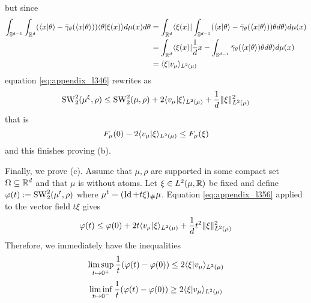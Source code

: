 but since
\begin{align}
    \int_{\mathbb S^{d-1}} \int_{\mathbb R^d} (\langle x|\theta\rangle - \bar{\gamma}_\theta(\langle x|\theta\rangle)) \langle\theta|\xi(x)\rangle d\mu(x) d\theta &= \int_{\mathbb R^d} \langle\xi(x)|\int_{\mathbb S^{d-1}} (\langle x|\theta\rangle - \bar{\gamma}_\theta(\langle x|\theta\rangle))\theta d\theta\rangle d\mu(x) \\
    &= \int_{\mathbb R^d} \langle\xi(x)|\frac{1}{d} x - \int_{\mathbb S^{d-1}} \bar{\gamma}_\theta(\langle x|\theta\rangle)\theta d\theta\rangle d\mu(x) \\
    &= \langle\xi|v_\mu\rangle_{L^2(\mu)}
\end{align}
equation \eqref{eq:appendix_l346} rewrites as
\begin{equation} \label{eq:appendix_l356}
    \mathop{\mathrm{SW}}\nolimits^2_2(\mu^\xi,\rho) \leq \mathop{\mathrm{SW}}\nolimits^2_2(\mu,\rho) + 2\langle v_\mu|\xi\rangle_{L^2(\mu)} + \frac 1d \|\xi\|^2_{L^2(\mu)}
\end{equation}
that is
\begin{equation} F_\mu(0) - 2\langle v_\mu|\xi\rangle_{L^2(\mu)} \leq F_\mu(\xi) \end{equation}
and this finishes proving (b). \newline

Finally, we prove (c). Assume that $\mu, \rho$ are supported in some compact set $\Omega \subseteq \mathbb R^d$ and that $\mu$ is without atoms. Let $\xi \in L^2(\mu,\mathbb R)$ be fixed and define $\varphi(t) := \mathop{\mathrm{SW}}\nolimits^2_2(\mu^t,\rho)$ where $\mu^t = (\mathop{\mathrm{Id}}\nolimits+t\xi)_\#\mu$. Equation \eqref{eq:appendix_l356} applied to the vector field $t\xi$ gives
\begin{equation} \varphi(t) \leq \varphi(0) + 2t\langle v_\mu|\xi\rangle_{L^2(\mu)} + \frac 1d t^2\|\xi\|^2_{L^2(\mu)} \end{equation}
Therefore, we immediately have the inequalities
\begin{equation} \limsup_{t \mapsto 0^+} \frac{1}{t} (\varphi(t) - \varphi(0)) \leq 2\langle\xi|v_\mu\rangle_{L^2(\mu)} \end{equation}
\begin{equation} \liminf_{t \mapsto 0^-} \frac{1}{t} (\varphi(t) - \varphi(0)) \geq 2\langle\xi|v_\mu\rangle_{L^2(\mu)} \end{equation}

